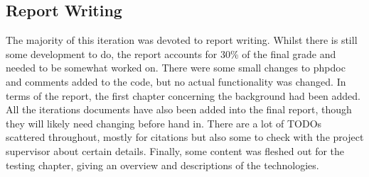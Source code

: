 \subsection{Report Writing}
The majority of this iteration was devoted to report writing. Whilst there is still some development to do, the report accounts for 30\% of the final grade and needed to be somewhat worked on. There were some small changes to phpdoc and comments added to the code, but no actual functionality was changed. In terms of the report, the first chapter concerning the background had been added. All the iterations documents have also been added into the final report, though they will likely need changing before hand in. There are a lot of TODOs scattered throughout, mostly for citations but also some to check with the project supervisor about certain details. Finally, some content was fleshed out for the testing chapter, giving an overview and descriptions of the technologies.
\newpage
